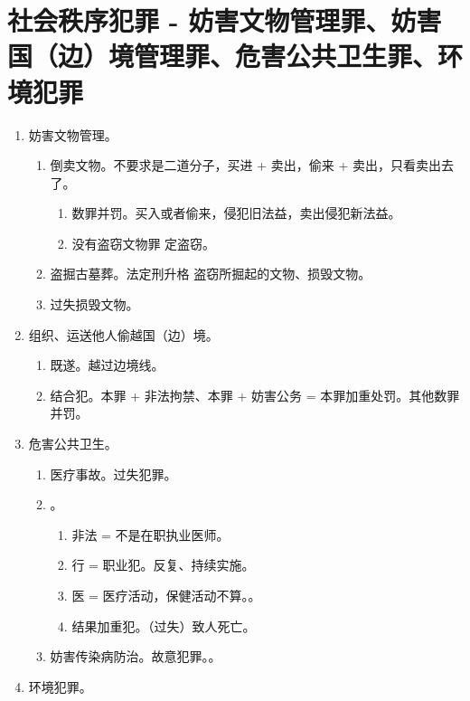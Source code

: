 \section{社会秩序犯罪 - 妨害文物管理罪、妨害国（边）境管理罪、危害公共卫生罪、环境犯罪}
\begin{enumerate}
  \item 妨害文物管理。
        \begin{enumerate}
          \item 倒卖文物。不要求是二道分子，买进 + 卖出，偷来 + 卖出，只看卖出去了。
                \begin{enumerate}
                  \item 数罪并罚。买入或者偷来，侵犯旧法益，卖出侵犯新法益。
                  \item 没有盗窃文物罪 \yjt 定盗窃。
                \end{enumerate}
          \item 盗掘古墓葬。法定刑升格 \yjt 盗窃所掘起的文物、损毁文物。
          \item 过失损毁文物。
        \end{enumerate}
  \item 组织、运送他人偷越国（边）境。
        \begin{enumerate}
          \item 既遂。越过边境线。
          \item 结合犯。本罪 + 非法拘禁、本罪 + 妨害公务 = 本罪加重处罚。其他数罪并罚。
        \end{enumerate}
  \item 危害公共卫生。
        \begin{enumerate}
          \item 医疗事故。过失犯罪。
          \item {}。
                \begin{enumerate}
                  \item 非法 = 不是在职执业医师。
                  \item 行 = 职业犯。反复、持续实施。
                  \item 医 = 医疗活动，保健活动不算。。
                  \item 结果加重犯。（过失）致人死亡。
                \end{enumerate}
          \item 妨害传染病防治。故意犯罪。。
        \end{enumerate}
  \item 环境犯罪。

\end{enumerate}
